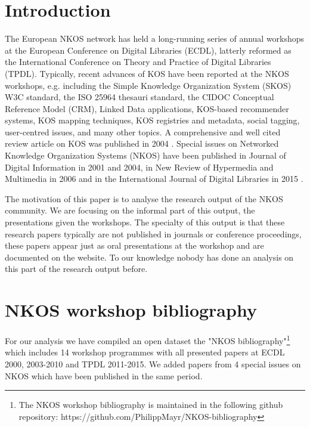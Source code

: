 \documentclass[runningheads,a4paper]{llncs}
\begin{document}
\section{Introduction}\label{intro}

The European NKOS network has held a long-running series of annual workshops at the European Conference on Digital Libraries (ECDL), latterly reformed as the International Conference on Theory and Practice of Digital Libraries (TPDL). 
Typically, recent advances of KOS have been reported at the NKOS workshops, e.g. including the Simple Knowledge Organization System (SKOS) W3C standard, the ISO 25964 thesauri standard, the CIDOC Conceptual Reference Model (CRM), Linked Data applications, KOS-based recommender systems, KOS mapping techniques, KOS registries and metadata, social tagging, user-centred issues, and many other topics. A comprehensive and well cited review article on KOS was published in 2004 \cite{Zeng2004}. Special issues on Networked Knowledge Organization Systems (NKOS) have been published in Journal of Digital Information in 2001 and 2004, in New Review of Hypermedia and Multimedia in 2006 and in the International Journal of Digital Libraries in 2015 \cite{Mayr2016}. 

The motivation of this paper is to analyse the research output of the NKOS community. We are focusing on the informal part of this output, the presentations given the workshops. The specialty of this output is that these research papers typically are not published in journals or conference proceedings, these papers appear just as oral presentations at the workshop and are documented on the website. To our knowledge nobody has done an analysis on this part of the research output before. 



\section{NKOS workshop bibliography}\label{dataset}

For our analysis we have compiled an open dataset the "NKOS bibliography"\footnote{The NKOS workshop bibliography is maintained in the following github repository: https://github.com/PhilippMayr/NKOS-bibliography} which includes 14 workshop programmes with all presented papers at ECDL 2000, 2003-2010 and TPDL 2011-2015. We added papers from 4 special issues on NKOS which have been published in the same period.
\end{document}
